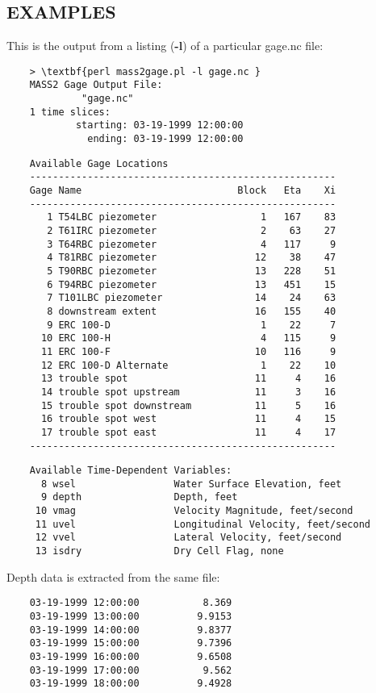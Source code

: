 \subsection*{EXAMPLES\label{mass2gage_pl_EXAMPLES}}

This is the output from a listing (\textbf{-l}) of a particular gage.nc file:

\begin{verbatim}
    > \textbf{perl mass2gage.pl -l gage.nc }
    MASS2 Gage Output File:
             "gage.nc"
    1 time slices:
            starting: 03-19-1999 12:00:00
              ending: 03-19-1999 12:00:00
\end{verbatim}
\begin{verbatim}
    Available Gage Locations
    -----------------------------------------------------
    Gage Name                           Block   Eta    Xi
    -----------------------------------------------------
       1 T54LBC piezometer                  1   167    83
       2 T61IRC piezometer                  2    63    27
       3 T64RBC piezometer                  4   117     9
       4 T81RBC piezometer                 12    38    47
       5 T90RBC piezometer                 13   228    51
       6 T94RBC piezometer                 13   451    15
       7 T101LBC piezometer                14    24    63
       8 downstream extent                 16   155    40
       9 ERC 100-D                          1    22     7
      10 ERC 100-H                          4   115     9
      11 ERC 100-F                         10   116     9
      12 ERC 100-D Alternate                1    22    10
      13 trouble spot                      11     4    16
      14 trouble spot upstream             11     3    16
      15 trouble spot downstream           11     5    16
      16 trouble spot west                 11     4    15
      17 trouble spot east                 11     4    17
    -----------------------------------------------------
\end{verbatim}
\begin{verbatim}
    Available Time-Dependent Variables:
      8 wsel                 Water Surface Elevation, feet
      9 depth                Depth, feet
     10 vmag                 Velocity Magnitude, feet/second
     11 uvel                 Longitudinal Velocity, feet/second
     12 vvel                 Lateral Velocity, feet/second
     13 isdry                Dry Cell Flag, none
\end{verbatim}


Depth data is extracted from the same file:

\begin{verbatim}
    03-19-1999 12:00:00           8.369
    03-19-1999 13:00:00          9.9153
    03-19-1999 14:00:00          9.8377
    03-19-1999 15:00:00          9.7396
    03-19-1999 16:00:00          9.6508
    03-19-1999 17:00:00           9.562
    03-19-1999 18:00:00          9.4928
\end{verbatim}

